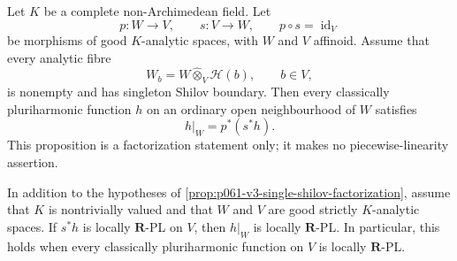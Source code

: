 
\begin{proposition}
\label{prop:p061-v3-single-shilov-factorization}
Let \(K\) be a complete non-Archimedean field. Let
\[
 p:W\longrightarrow V,
 \qquad s:V\longrightarrow W,
 \qquad p\circ s=\operatorname{id}_V
\]
be morphisms of good \(K\)-analytic spaces, with \(W\) and \(V\)
affinoid. Assume that every analytic fibre
\[
                    W_b=W\widehat\otimes_V\mathscr H(b),
                    \qquad b\in V,
\]
is nonempty and has singleton Shilov boundary. Then every classically
pluriharmonic function \(h\) on an ordinary open neighbourhood of \(W\)
satisfies
\begin{equation}\label{eq:p061-v3-single-shilov-factorization}
                         h|_W=p^*(s^*h).
\end{equation}
This proposition is a factorization statement only; it makes no
piecewise-linearity assertion.
\end{proposition}

\begin{corollary}
\label{cor:p061-v3-single-shilov-rpl}
In addition to the hypotheses of
\cref{prop:p061-v3-single-shilov-factorization}, assume that \(K\) is
nontrivially valued and that \(W\) and \(V\) are good strictly
\(K\)-analytic spaces. If \(s^*h\) is locally \(\mathbf R\)-PL on \(V\),
then \(h|_W\) is locally \(\mathbf R\)-PL. In particular, this holds when
every classically pluriharmonic function on \(V\) is locally
\(\mathbf R\)-PL.
\end{corollary}

